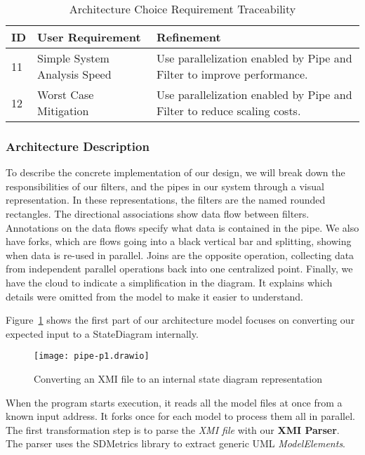 \begin{table}[htbp]
    \centering
    \caption{Architecture Choice Requirement Traceability}\label{tab:arch-choice-table}
    \begin{tabularx}{\textwidth}{| l | l | X |}
        \hline
        \textbf{ID} & \textbf{User Requirement} & \textbf{Refinement} \\
        \hline
        11 & Simple System Analysis Speed & Use parallelization enabled by Pipe and Filter to improve performance. \\ \hline
        12 & Worst Case Mitigation & Use parallelization enabled by Pipe and Filter to reduce scaling costs.  \\ \hline
    \end{tabularx}
\end{table}

\newpage
\subsubsection{Architecture Description}\label{subsubsec:arch-desc}
To describe the concrete implementation of our design,
we will break down the responsibilities of our filters, and the pipes in our system through a visual representation.
In these representations, the filters are the named rounded rectangles.
The directional associations show data flow between filters.
Annotations on the data flows specify what data is contained in the pipe.
We also have forks, which are flows going into a black vertical bar and splitting, showing when data is re-used in parallel.
Joins are the opposite operation, collecting data from independent parallel operations back into one centralized point.
Finally, we have the cloud to indicate a simplification in the diagram.
It explains which details were omitted from the model to make it easier to understand.

Figure~\ref{fig:pipe-1} shows the first part of our architecture model focuses on converting our expected input to a StateDiagram internally.
\begin{figure}[h]
    \centering
    \texttt{[image: pipe-p1.drawio]}
    \caption{Converting an XMI file to an internal state diagram representation}
    \label{fig:pipe-1}
\end{figure}

When the program starts execution, it reads all the model files at once from a known input address.
It forks once for each model to process them all in parallel.
The first transformation step is to parse the \textit{XMI file} with our \textbf{XMI Parser}.
The parser uses the SDMetrics library to extract generic UML \textit{ModelElements}.

